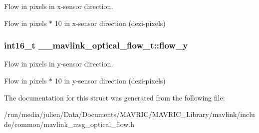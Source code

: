 Flow in pixels in x-\/sensor direction. 

Flow in pixels $\ast$ 10 in x-\/sensor direction (dezi-\/pixels) \hypertarget{struct____mavlink__optical__flow__t_aaf2884728b3ae06ec464c9cf2f8ce1c2}{
\subsubsection[{flow\+\_\+y}]{\setlength{\rightskip}{0pt plus 5cm}int16\+\_\+t \+\_\+\+\_\+mavlink\+\_\+optical\+\_\+flow\+\_\+t\+::flow\+\_\+y}}\label{struct____mavlink__optical__flow__t_aaf2884728b3ae06ec464c9cf2f8ce1c2}


Flow in pixels in y-\/sensor direction. 

Flow in pixels $\ast$ 10 in y-\/sensor direction (dezi-\/pixels) 

The documentation for this struct was generated from the following file\+:\begin{DoxyCompactItemize}
\item 
/run/media/julien/\+Data/\+Documents/\+M\+A\+V\+R\+I\+C/\+M\+A\+V\+R\+I\+C\+\_\+\+Library/mavlink/include/common/mavlink\+\_\+msg\+\_\+optical\+\_\+flow.\+h\end{DoxyCompactItemize}

